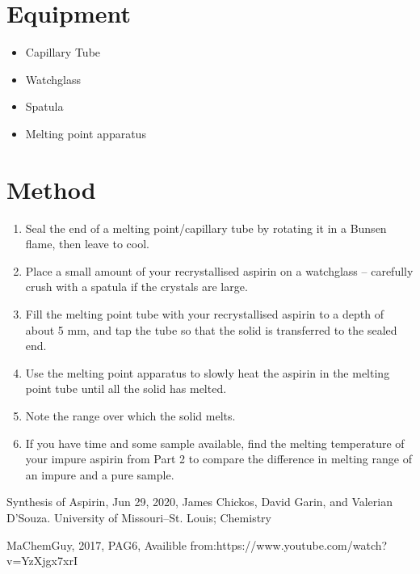 \section{Equipment}
\begin{itemize}
    \item Capillary Tube
    \item Watchglass
    \item Spatula
    \item Melting point apparatus 
\end{itemize}

\section{Method}
\begin{enumerate}
    \item Seal the end of a melting point/capillary tube by rotating it in a Bunsen flame, then leave to cool. 
    \item Place a small amount of your recrystallised aspirin on a watchglass – carefully crush with a spatula if the crystals are large. 
    \item Fill the melting point tube with your recrystallised aspirin to a depth of about 5 mm, and tap the tube so that the solid is transferred to the sealed end.
    \item Use the melting point apparatus to slowly heat the aspirin in the melting point tube until all the solid has melted.
    \item Note the range over which the solid melts. 
    \item If you have time and some sample available, find the melting temperature of your impure aspirin from Part 2 to compare the difference in melting range of an impure and a pure sample. 
\end{enumerate}




Synthesis of Aspirin, Jun 29, 2020, James Chickos, David Garin, and Valerian D'Souza. University of Missouri–St. Louis; Chemistry

MaChemGuy, 2017, PAG6, Availible from:https://www.youtube.com/watch?v=YzXjgx7xrI